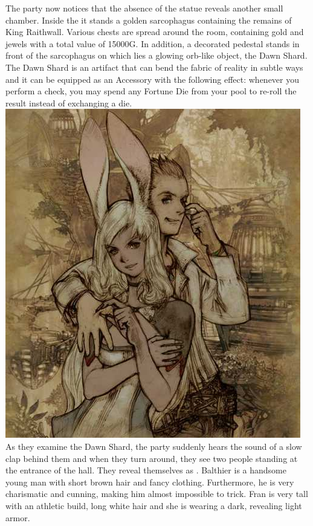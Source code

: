 The party now notices that the absence of the statue reveals another small chamber.
Inside the it stands a golden sarcophagus containing the remains of King Raithwall.
Various chests are spread around the room, containing gold and jewels with a total value of 15000G.
In addition, a decorated pedestal stands in front of the sarcophagus on which lies a glowing orb-like object, the Dawn Shard.
The Dawn Shard is an artifact that can bend the fabric of reality in subtle ways and it can be equipped as an Accessory with the following effect: whenever you perform a check, you may spend any Fortune Die from your pool to re-roll the result instead of exchanging a die.
%
\vfill
%
\includegraphics[width=\columnwidth]{./art/tombofraithwall/franandbalthier.jpg}
%
\clearpage
%
As they examine the Dawn Shard, the party suddenly hears the sound of a slow clap behind them and when they turn around, they see two people standing at the entrance of the hall.
They reveal themselves as .
Balthier is a handsome young man with short brown hair and fancy clothing.
Furthermore, he is very charismatic and cunning, making him almost impossible to trick.
Fran is very tall with an athletic build, long white hair and she is wearing a dark, revealing light armor.
